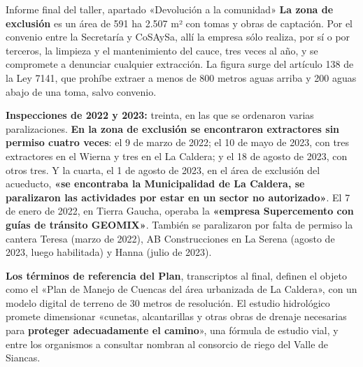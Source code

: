 \begin{ficha}{Informe final del taller, apartado «Devolución a la comunidad»}
\textbf{La zona de exclusión} es un área de 591 ha 2.507 m² con tomas y obras de captación. Por el convenio entre la Secretaría y CoSAySa, allí la empresa sólo realiza, por sí o por terceros, la limpieza y el mantenimiento del cauce, tres veces al año, y se compromete a denunciar cualquier extracción. La figura surge del artículo 138 de la Ley 7141, que prohíbe extraer a menos de 800 metros aguas arriba y 200 aguas abajo de una toma, salvo convenio.

\textbf{Inspecciones de 2022 y 2023:} treinta, en las que se ordenaron varias paralizaciones. \textbf{En la zona de exclusión se encontraron extractores sin permiso cuatro veces}: el 9 de marzo de 2022; el 10 de mayo de 2023, con tres extractores en el Wierna y tres en el La Caldera; y el 18 de agosto de 2023, con otros tres. Y la cuarta, el 1 de agosto de 2023, en el área de exclusión del acueducto, \textbf{«se encontraba la Municipalidad de La Caldera, se paralizaron las actividades por estar en un sector no autorizado»}. El 7 de enero de 2022, en Tierra Gaucha, operaba la \textbf{«empresa Supercemento con guías de tránsito GEOMIX»}. También se paralizaron por falta de permiso la cantera Teresa (marzo de 2022), AB Construcciones en La Serena (agosto de 2023, luego habilitada) y Hanna (julio de 2023).

\textbf{Los términos de referencia del Plan}, transcriptos al final, definen el objeto como el «Plan de Manejo de Cuencas del área urbanizada de La Caldera», con un modelo digital de terreno de 30 metros de resolución. El estudio hidrológico promete dimensionar «cunetas, alcantarillas y otras obras de drenaje necesarias para \textbf{proteger adecuadamente el camino}», una fórmula de estudio vial, y entre los organismos a consultar nombran al consorcio de riego del Valle de Siancas.
\end{ficha}

